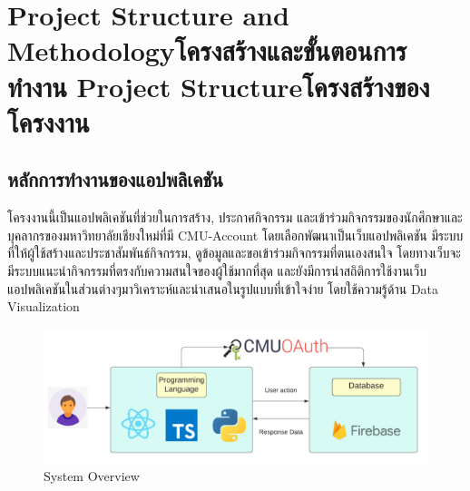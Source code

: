 \chapter{\ifproject%
\ifenglish Project Structure and Methodology\else โครงสร้างและขั้นตอนการทำงาน\fi
\else%
\ifenglish Project Structure\else โครงสร้างของโครงงาน\fi
\fi
}


\makeatletter


\makeatother



\section{หลักการทำงานของแอปพลิเคชัน}
โครงงานนี้เป็นแอปพลิเคชันที่ช่วยในการสร้าง, ประกาศกิจกรรม และเข้าร่วมกิจกรรมของนักศึกษาและบุคลากรของมหาวิทยาลัยเชียงใหม่ที่มี CMU-Account
โดยเลือกพัฒนาเป็นเว็บแอปพลิเคชัน มีระบบที่ให้ผู้ใช้สร้างและประชาสัมพันธ์กิจกรรม, ดูข้อมูลและขอเข้าร่วมกิจกรรมที่ตนเองสนใจ โดยทางเว็บจะมีระบบแนะนำกิจกรรมที่ตรงกับความสนใจของผู้ใช้มากที่สุด และยังมีการนำสถิติการใช้งานเว็บแอปพลิเคชันในส่วนต่างๆมาวิเคราะห์และนำเสนอในรูปแบบที่เข้าใจง่าย โดยใช้ความรู้ด้าน Data Visualization
\begin{figure}[h] %
\begin{center}
\includegraphics[width=0.9\linewidth]{image/31_system_overview.png}
\end{center}
\caption[หลักการทำงานของแอปพลิเคชัน]{System Overview}
\label{fig:system_overview}
\end{figure}
